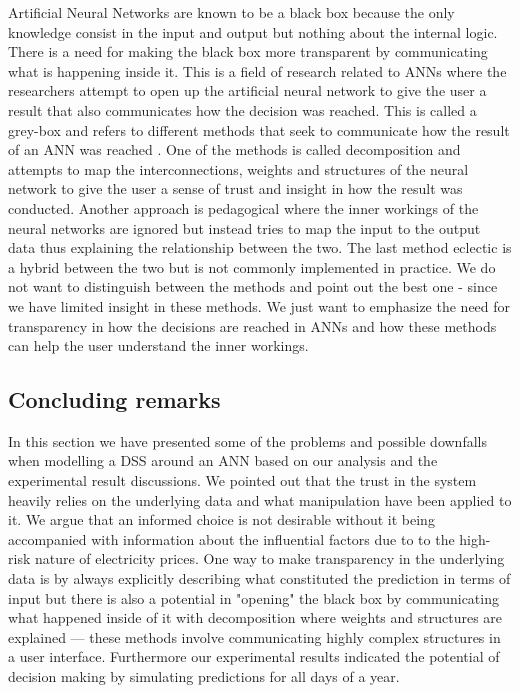 Artificial Neural Networks are known to be a black box \cite{fromBlackBoxToTransparentBox} because the only knowledge consist in the input and output but nothing about the internal logic. There is a need for making the black box more transparent by communicating what is happening inside it. This is a field of research related to ANNs where the researchers attempt to open up the artificial neural network to give the user a result that also communicates how the decision was reached. This is called a grey-box and refers to different methods that seek to communicate how the result of an ANN was reached \cite{young2010using}. One of the methods is called decomposition and attempts to map the interconnections, weights and structures of the neural network to give the user a sense of trust and insight in how the result was conducted. Another approach is pedagogical where the inner workings of the neural networks are ignored but instead tries to map the input to the output data thus explaining the relationship between the two. The last method eclectic is a hybrid between the two but is not commonly implemented in practice. We do not want to distinguish between the methods and point out the best one - since we have limited insight in these methods. We just want to emphasize the need for transparency in how the decisions are reached in ANNs and how these methods can help the user understand the inner workings.

\subsection{Concluding remarks}
In this section we have presented some of the problems and possible downfalls when modelling a DSS around an ANN based on our analysis and the experimental result discussions. We pointed out that the trust in the system heavily relies on the underlying data and what manipulation have been applied to it. We argue that an informed choice is not desirable without it being accompanied with information about the influential factors due to to the high-risk nature of electricity prices. One way to make transparency in the underlying data is by always explicitly describing what constituted the prediction in terms of input but there is also a potential in "opening" the black box by communicating what happened inside of it with decomposition where weights and structures are explained --- these methods involve communicating highly complex structures in a user interface. Furthermore our experimental results indicated the potential of decision making by simulating predictions for all days of a year.

